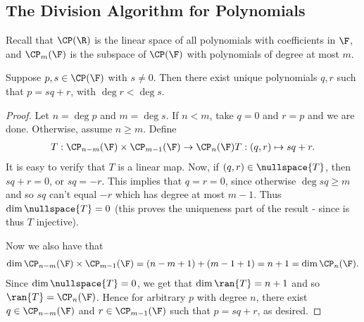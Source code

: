 \documentclass{article}
\begin{document}
\subsection{The Division Algorithm for Polynomials}
Recall that $\CP(\R)$ is the linear space of all polynomials with coefficients in $\F$, and $\CP_m(\F)$ is the subspace of $\CP(\F)$ with polynomials of degree at most $m$.
\begin{prop}\label{prop:divison_algo}
  Suppose $p, s \in \CP(\F)$ with $s \neq 0$. Then there exist unique polynomials $q, r$ such that $p = sq + r$, with $\deg{r} < \deg{s}$.
\end{prop}
\begin{proof}
  Let $n = \deg{p}$ and $m = \deg{s}$. If $n < m$, take $q = 0$ and $r = p$ and we are done. Otherwise, assume $n \geq m$. Define
  \begin{align*}
    T: \CP_{n - m}(\F)\times\CP_{m - 1}(\F) \to \CP_n(\F)
    T: (q, r) \mapsto sq + r.
  \end{align*}
  It is easy to verify that $T$ is a linear map. Now, if $(q, r) \in \nullspace{T}$, then $sq + r = 0$, or $sq = -r$. This implies that $q = r = 0$, since otherwise $\deg{sq} \geq m$ and so
  $sq$ can't equal $-r$ which has degree at most $m - 1$. Thus $\dim{\nullspace{T}} = 0$ (this proves the uniqueness part of the result - since is thus $T$ injective).

  Now we also have that
  \begin{align*}
    \dim{\CP_{n - m}(\F)\times\CP_{m - 1}(\F)} = (n - m + 1) + (m - 1 + 1) = n + 1 = \dim{\CP_n(\F)}.
  \end{align*}
  Since $\dim{\nullspace{T}} = 0$, we get that $\dim{\ran{T}} = n + 1$ and so $\ran{T} = \CP_n(\F)$. Hence for arbitrary $p$ with degree $n$, there exist $q \in \CP_{n - m}(\F)$ and $r \in
  \CP_{m - 1}(\F)$ such that $p = sq + r$, as desired.
\end{proof}
\end{document}
